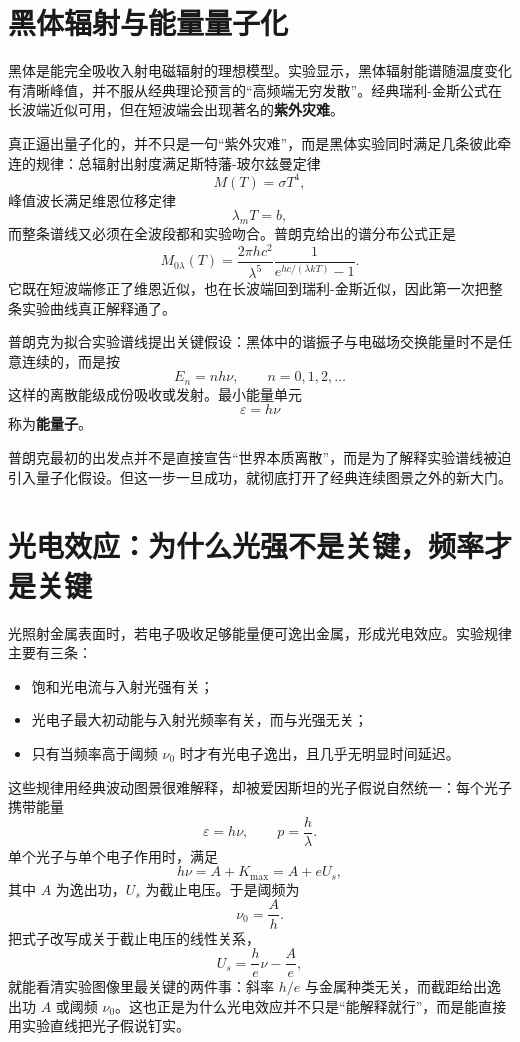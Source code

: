 \documentclass[lang=cn,11pt]{elegantbook}
\begin{document}
\section{黑体辐射与能量量子化}

黑体是能完全吸收入射电磁辐射的理想模型。实验显示，黑体辐射能谱随温度变化有清晰峰值，并不服从经典理论预言的“高频端无穷发散”。经典瑞利-金斯公式在长波端近似可用，但在短波端会出现著名的\textbf{紫外灾难}。

真正逼出量子化的，并不只是一句“紫外灾难”，而是黑体实验同时满足几条彼此牵连的规律：总辐射出射度满足斯特藩-玻尔兹曼定律
\[
M(T)=\sigma T^4,
\]
峰值波长满足维恩位移定律
\[
\lambda_m T=b,
\]
而整条谱线又必须在全波段都和实验吻合。普朗克给出的谱分布公式正是
\[
M_{0\lambda}(T)=\frac{2\pi hc^2}{\lambda^5}\frac{1}{e^{hc/(\lambda kT)}-1}.
\]
它既在短波端修正了维恩近似，也在长波端回到瑞利-金斯近似，因此第一次把整条实验曲线真正解释通了。

普朗克为拟合实验谱线提出关键假设：黑体中的谐振子与电磁场交换能量时不是任意连续的，而是按
\[
E_n=nh\nu,\qquad n=0,1,2,\dots
\]
这样的离散能级成份吸收或发射。最小能量单元
\[
\varepsilon=h\nu
\]
称为\textbf{能量子}。

\begin{remark}
普朗克最初的出发点并不是直接宣告“世界本质离散”，而是为了解释实验谱线被迫引入量子化假设。但这一步一旦成功，就彻底打开了经典连续图景之外的新大门。
\end{remark}

\section{光电效应：为什么光强不是关键，频率才是关键}

光照射金属表面时，若电子吸收足够能量便可逸出金属，形成光电效应。实验规律主要有三条：
\begin{itemize}
  \item 饱和光电流与入射光强有关；
  \item 光电子最大初动能与入射光频率有关，而与光强无关；
  \item 只有当频率高于阈频 \(\nu_0\) 时才有光电子逸出，且几乎无明显时间延迟。
\end{itemize}

这些规律用经典波动图景很难解释，却被爱因斯坦的光子假说自然统一：每个光子携带能量
\[
\varepsilon=h\nu,
\qquad
p=\frac{h}{\lambda}.
\]
单个光子与单个电子作用时，满足
\[
h\nu=A+K_{\max}=A+eU_s,
\]
其中 \(A\) 为逸出功，\(U_s\) 为截止电压。于是阈频为
\[
\nu_0=\frac{A}{h}.
\]
把式子改写成关于截止电压的线性关系，
\[
U_s=\frac{h}{e}\nu-\frac{A}{e},
\]
就能看清实验图像里最关键的两件事：斜率 \(h/e\) 与金属种类无关，而截距给出逸出功 \(A\) 或阈频 \(\nu_0\)。这也正是为什么光电效应并不只是“能解释就行”，而是能直接用实验直线把光子假说钉实。
\end{document}
